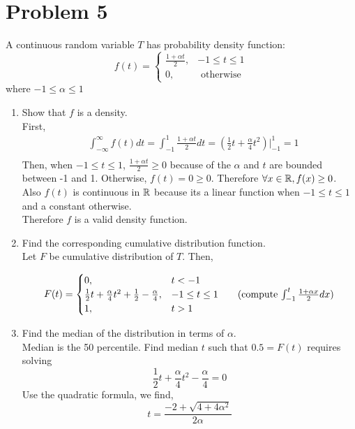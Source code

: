 \documentclass[11pt]{article}
\begin{document}
\section*{Problem 5}
A continuous random variable $T$ has probability density function:
\[
  f(t) =
  \begin{cases}
    \frac{1+\alpha t}{2} , & -1\leq t\leq 1\\
    0 , & \text{ otherwise }
  \end{cases}
\]
where $-1 \leq \alpha \leq 1$

\begin{enumerate}
  \item Show that $f$ is a density.
  \\First,
  \begin{align*}
    &\displaystyle\int_{-\infty}^{\infty} f(t) dt = \int_{-1}^1 \frac{1+\alpha t}{2} dt = (\frac{1}{2}t + \frac{\alpha}{4}t^2)\Big\vert_{-1}^1 = 1 \\
  \end{align*}
  Then, when $-1\leq t\leq 1$, $\frac{1+\alpha t}{2} \geq 0$ because of the $\alpha$ and $t$ are bounded between -1 and 1. Otherwise, $f(t) = 0 \geq 0$. Therefore $\forall x\in \mathbb{R}, f(x)\geq 0$. Also $f(t)$ is continuous in $\mathbb{R}$ because its a linear function when $-1\leq t\leq 1$ and a constant otherwise.\\
  Therefore $f$ is a valid density function.

  \item Find the corresponding cumulative distribution function.\\
  Let $F$ be cumulative distribution of $T$. Then,

  \[
    F(t) =
    \begin{cases}
      0, & t<-1\\
      \frac{1}{2}t + \frac{\alpha}{4}t^2 + \frac{1}{2} - \frac{\alpha}{4}, & -1 \leq t \leq 1 \tag{compute $\int_{-1}^t \frac{1 + \alpha x}{2} dx$}\\
      1, & t > 1\\
    \end{cases}
  \]

  \item Find the median of the distribution in terms of $\alpha$.\\
  Median is the 50 percentile. Find median $t$ such that $0.5 = F(t)$ requires solving
  \[
    \frac{1}{2}t + \frac{\alpha}{4}t^2 - \frac{\alpha}{4} = 0
  \]
  Use the quadratic formula, we find,
  \[
    t = \frac{-2 + \sqrt{4 + 4\alpha^2}}{2\alpha}
  \]



\end{enumerate}
\end{document}
